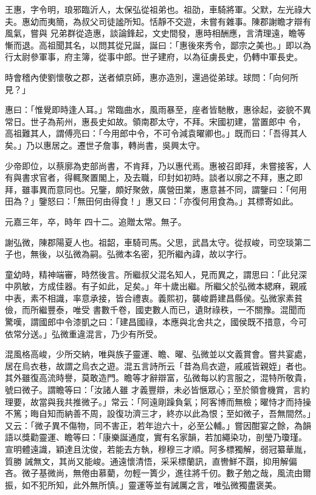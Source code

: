 
\begin{pinyinscope}

 王惠，字令明，琅邪臨沂人，太保弘從祖弟也。祖劭，車騎將軍。父默，左光祿大夫。惠幼而夷簡，為叔父司徒謐所知。恬靜不交遊，未嘗有雜事。陳郡謝瞻才辯有風氣，嘗與
 兄弟群從造惠，談論鋒起，文史間發，惠時相酬應，言清理遠，瞻等慚而退。高祖聞其名，以問其從兄誕，誕曰：「惠後來秀令，鄙宗之美也。」即以為行太尉參軍事，府主簿，從事中郎。世子建府，以為征虜長史，仍轉中軍長史。



 時會稽內使劉懷敬之郡，送者傾京師，惠亦造別，還過從弟球。球問：「向何所見？」



 惠曰：「惟覺即時逢人耳。」常臨曲水，風雨暴至，座者皆馳散，惠徐起，姿貌不異常日。世子為荊州，惠長史如故。領南郡太守，不拜。宋國初建，當置郎中
 令，高祖難其人，謂傅亮曰：「今用郎中令，不可令減袁曜卿也。」既而曰：「吾得其人矣。」乃以惠居之。遷世子詹事，轉尚書，吳興太守。



 少帝即位，以蔡廓為吏部尚書，不肯拜，乃以惠代焉。惠被召即拜，未嘗接客，人有與書求官者，得輒聚置閣上，及去職，印封如初時。談者以廓之不拜，惠之即拜，雖事異而意同也。兄鑒，頗好聚斂，廣營田業，惠意甚不同，謂鑒曰：「何用田為？」鑒怒曰：「無田何由得食！」惠又曰：「亦復何用食為。」其標寄如此。



 元嘉三年，卒，時年
 四十二。追贈太常。無子。



 謝弘微，陳郡陽夏人也。祖韶，車騎司馬。父思，武昌太守。從叔峻，司空琰第二子也，無後，以弘微為嗣。弘微本名密，犯所繼內諱，故以字行。



 童幼時，精神端審，時然後言。所繼叔父混名知人，見而異之，謂思曰：「此兒深中夙敏，方成佳器。有子如此，足矣。」年十歲出繼。所繼父於弘微本緦麻，親戚中表，素不相識，率意承接，皆合禮衷。義熙初，襲峻爵建昌縣侯。弘微家素貧儉，而所繼豐泰，唯受
 書數千卷，國吏數人而已，遺財祿秩，一不關豫。混聞而驚嘆，謂國郎中令漆凱之曰：「建昌國祿，本應與北舍共之，國侯既不措意，今可依常分送。」弘微重違混言，乃少有所受。



 混風格高峻，少所交納，唯與族子靈運、瞻、曜、弘微並以文義賞會。嘗共宴處，居在烏衣巷，故謂之烏衣之遊。混五言詩所云「昔為烏衣遊，戚戚皆親姪」者也。其外雖復高流時譽，莫敢造門。瞻等才辭辯富，弘微每以約言服之，混特所敬貴，號曰微子。謂瞻等曰：「汝諸人雖
 才義豐辯，未必皆愜眾心；至於領會機賞，言約理要，故當與我共推微子。」常云：「阿遠剛躁負氣；阿客博而無檢；曜恃才而持操不篤；晦自知而納善不周，設復功濟三才，終亦以此為恨；至如微子，吾無間然。」又云：「微子異不傷物，同不害正，若年迨六十，必至公輔。」嘗因酣宴之餘，為韻語以獎勸靈運、瞻等曰：「康樂誕通度，實有名家韻，若加繩染功，剖瑩乃瓊瑾。宣明體遠識，穎達且沈俊，若能去方執，穆穆三才順。阿多標獨解，弱冠纂華胤，質勝
 誡無文，其尚又能峻。通遠懷清悟，采采標蘭訊，直轡鮮不躓，抑用解偏吝。微子基微尚，無倦由慕藺，勿輕一簣少，進往將千仞。數子勉之哉，風流由爾振，如不犯所知，此外無所慎。」靈運等並有誡厲之言，唯弘微獨盡褒美。




\end{pinyinscope}
